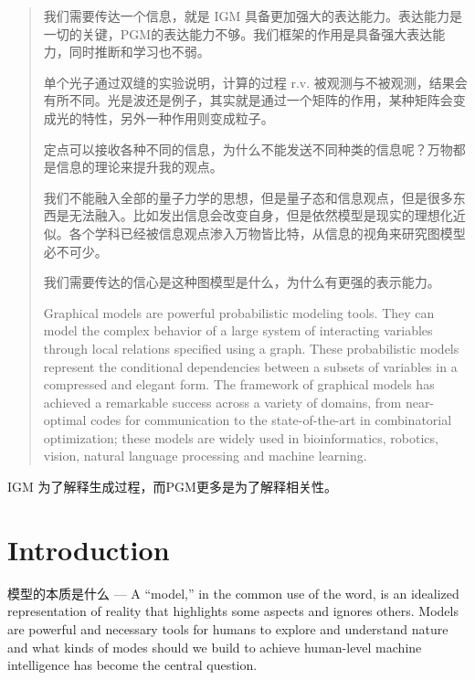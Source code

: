 \documentclass{article}
\theoremstyle{definition}
\theoremstyle{remark}
\theoremstyle{definition}
\begin{document}
\begin{CJK*}{UTF8}{gbsn}
\begin{abstract}
    我们需要传达一个信息，就是 IGM 具备更加强大的表达能力。表达能力是一切的关键，PGM的表达能力不够。我们框架的作用是具备强大表达能力，同时推断和学习也不弱。
    
    单个光子通过双缝的实验说明，计算的过程 r.v. 被观测与不被观测，结果会有所不同。光是波还是例子，其实就是通过一个矩阵的作用，某种矩阵会变成光的特性，另外一种作用则变成粒子。
    
    定点可以接收各种不同的信息，为什么不能发送不同种类的信息呢？万物都是信息的理论来提升我的观点。
    
    
    我们不能融入全部的量子力学的思想，但是量子态和信息观点，但是很多东西是无法融入。比如发出信息会改变自身，但是依然模型是现实的理想化近似。各个学科已经被信息观点渗入万物皆比特，从信息的视角来研究图模型必不可少。
    
    
    我们需要传达的信心是这种图模型是什么，为什么有更强的表示能力。
    
    Graphical models are powerful probabilistic modeling tools. They can model the complex behavior of a large system of interacting variables through local relations specified using a graph. These probabilistic models represent the conditional dependencies between a subsets of variables in a compressed and elegant form. The framework of graphical models has achieved a remarkable success across a variety of domains, from near-optimal codes for communication to the state-of-the-art in combinatorial optimization; these models are widely used in bioinformatics, robotics, vision, natural language processing and machine learning. 

\end{abstract}

IGM 为了解释生成过程，而PGM更多是为了解释相关性。

\tableofcontents




\section{Introduction}



模型的本质是什么 ---
A “model,” in the common use of the word, is an idealized representation of reality that highlights some aspects and ignores others\cite{Pearl2009}.
Models are powerful and necessary tools for humans to explore and understand nature and what kinds of modes should we build to achieve human-level machine intelligence has become the central question.


\end{CJK*}
\end{document}
